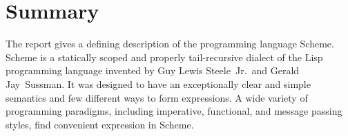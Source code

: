 
\thispagestyle{empty}




\chapter*{Summary}

The report gives a defining description of the programming language
Scheme.  Scheme is a statically scoped and properly tail-recursive
dialect of the Lisp programming language invented by Guy Lewis
Steele~Jr.\ and Gerald Jay~Sussman.  It was designed to have an
exceptionally clear and simple semantics and few different ways to
form expressions.  A wide variety of programming paradigms, including
imperative, functional, and message passing styles, find convenient
expression in Scheme.

